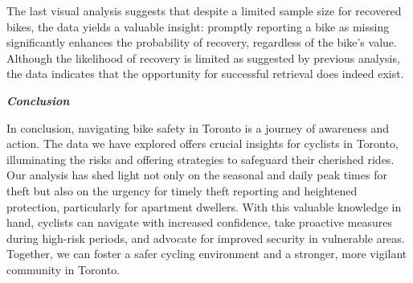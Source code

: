 \documentclass[
  11pt,
]{article}
\begin{document}
\indent The last visual analysis suggests that despite a limited sample
size for recovered bikes, the data yields a valuable insight: promptly
reporting a bike as missing significantly enhances the probability of
recovery, regardless of the bike's value. Although the likelihood of
recovery is limited as suggested by previous analysis, the data
indicates that the opportunity for successful retrieval does indeed
exist.

\newpage

\textbf{\emph{Conclusion}}

\indent In conclusion, navigating bike safety in Toronto is a journey of
awareness and action. The data we have explored offers crucial insights
for cyclists in Toronto, illuminating the risks and offering strategies
to safeguard their cherished rides. Our analysis has shed light not only
on the seasonal and daily peak times for theft but also on the urgency
for timely theft reporting and heightened protection, particularly for
apartment dwellers. With this valuable knowledge in hand, cyclists can
navigate with increased confidence, take proactive measures during
high-risk periods, and advocate for improved security in vulnerable
areas. Together, we can foster a safer cycling environment and a
stronger, more vigilant community in Toronto.
\end{document}
